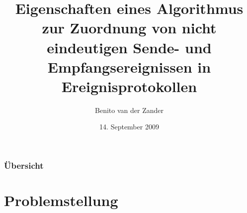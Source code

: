 \documentclass[ignorenonframetext]{beamer}
\title[]{Eigenschaften eines Algorithmus zur Zuordnung von nicht eindeutigen Sende- und Empfangsereignissen in Ereignisprotokollen}
\author{Benito van der Zander}
\institute%
{Lehrstuhl für Rechnernetze\\
Heinrich-Heine-Universität D\"usseldorf}
\date{14. September 2009}
\begin{document}
\begin{frame}
  \titlepage
\end{frame}



\begin{frame}
  \frametitle{Übersicht}

\tableofcontents


\end{frame}

\section{Problemstellung}
\end{document}
